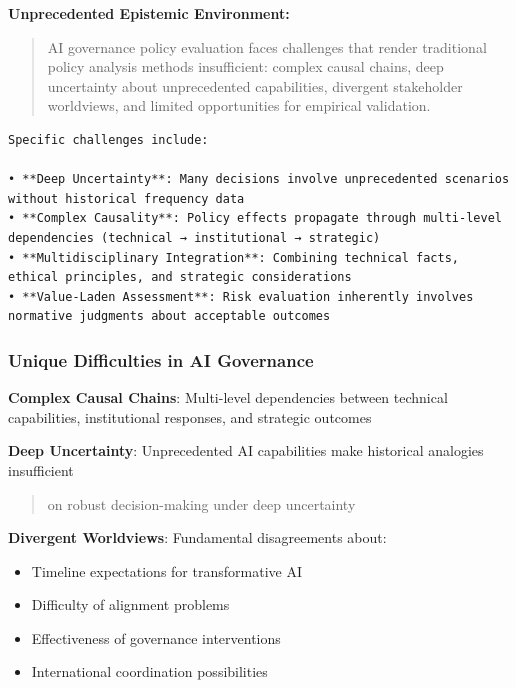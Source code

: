 \documentclass[
  11pt,
  letterpaper,
]{book}
\providecommand{\tightlist}{%
  \setlength{\itemsep}{0pt}\setlength{\parskip}{0pt}}
\begin{document}
\textbf{Unprecedented Epistemic Environment:}

\begin{quote}
AI governance policy evaluation faces challenges that render traditional
policy analysis methods insufficient: complex causal chains, deep
uncertainty about unprecedented capabilities, divergent stakeholder
worldviews, and limited opportunities for empirical validation.
\end{quote}

\begin{verbatim}
Specific challenges include:

• **Deep Uncertainty**: Many decisions involve unprecedented scenarios without historical frequency data
• **Complex Causality**: Policy effects propagate through multi-level dependencies (technical → institutional → strategic)
• **Multidisciplinary Integration**: Combining technical facts, ethical principles, and strategic considerations
• **Value-Laden Assessment**: Risk evaluation inherently involves normative judgments about acceptable outcomes
\end{verbatim}

\subsubsection{Unique Difficulties in AI
Governance}\label{sec-unique-difficulties}

\textbf{Complex Causal Chains}: Multi-level dependencies between
technical capabilities, institutional responses, and strategic outcomes

\textbf{Deep Uncertainty}: Unprecedented AI capabilities make historical
analogies insufficient

\begin{quote}
\textcite{lempert2003} on robust decision-making under deep uncertainty
\end{quote}

\textbf{Divergent Worldviews}: Fundamental disagreements about:

\begin{itemize}
\tightlist
\item
  Timeline expectations for transformative AI
\item
  Difficulty of alignment problems
\item
  Effectiveness of governance interventions
\item
  International coordination possibilities
\end{itemize}
\end{document}
